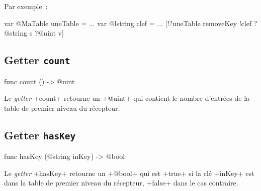 Par exemple~:
\begin{galgas}
var @MaTable uneTable = {}
...
var @lstring clef = ...
[!?uneTable removeKey !clef ?@string s ?@uint v]
\end{galgas}


%
%

\subsection{Getter \texttt{count}}

\begin{galgas}
func count () -> @uint
\end{galgas}


Le \emph{getter} \ggs+count+ retourne un \ggs+@uint+ qui contient le nombre d'entrées de la table de premier niveau du récepteur.



\subsection{Getter \texttt{hasKey}}

\begin{galgas}
func hasKey (@string inKey) -> @bool
\end{galgas}


Le \emph{getter} \ggs+hasKey+ retourne un \ggs+@bool+ qui est \ggs+true+ si la clé \ggs+inKey+ est dans la table de premier niveau du récepteur, \ggs+false+ dans le cas contraire.



